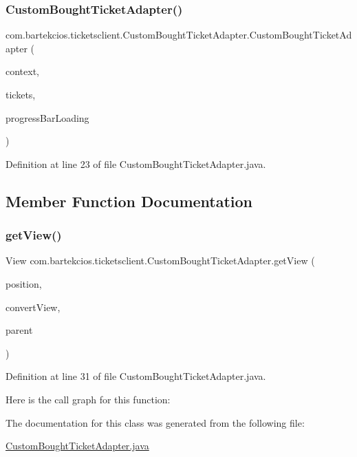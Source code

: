 \subsubsection{\texorpdfstring{Custom\+Bought\+Ticket\+Adapter()}{CustomBoughtTicketAdapter()}}
{\footnotesize\ttfamily com.\+bartekcios.\+ticketsclient.\+Custom\+Bought\+Ticket\+Adapter.\+Custom\+Bought\+Ticket\+Adapter (\begin{DoxyParamCaption}\item[{Context}]{context,  }\item[{List$<$ \hyperlink{classcom_1_1bartekcios_1_1ticketsclient_1_1_bought_ticket}{Bought\+Ticket} $>$}]{tickets,  }\item[{Progress\+Bar}]{progress\+Bar\+Loading }\end{DoxyParamCaption})}



Definition at line 23 of file Custom\+Bought\+Ticket\+Adapter.\+java.



\subsection{Member Function Documentation}
\mbox{\label{classcom_1_1bartekcios_1_1ticketsclient_1_1_custom_bought_ticket_adapter_aa823d02ed2bda7d3636f88373476fa3b}} 
\subsubsection{\texorpdfstring{get\+View()}{getView()}}
{\footnotesize\ttfamily View com.\+bartekcios.\+ticketsclient.\+Custom\+Bought\+Ticket\+Adapter.\+get\+View (\begin{DoxyParamCaption}\item[{int}]{position,  }\item[{View}]{convert\+View,  }\item[{View\+Group}]{parent }\end{DoxyParamCaption})}



Definition at line 31 of file Custom\+Bought\+Ticket\+Adapter.\+java.

Here is the call graph for this function\+:


The documentation for this class was generated from the following file\+:\begin{DoxyCompactItemize}
\item 
\hyperlink{_custom_bought_ticket_adapter_8java}{Custom\+Bought\+Ticket\+Adapter.\+java}\end{DoxyCompactItemize}

